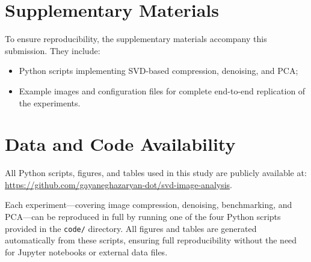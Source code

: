 \documentclass[11pt,a4paper]{article}
\begin{document}
\section{Supplementary Materials}
\label{sec:appendix-supp}

To ensure reproducibility, the supplementary materials accompany this submission. 
They include:
\begin{itemize}[leftmargin=*,noitemsep,topsep=0pt]
    \item Python scripts implementing SVD-based compression, denoising, and PCA;
    \item Example images and configuration files for complete end-to-end replication of the experiments.
\end{itemize}

\section*{Data and Code Availability}
All Python scripts, figures, and tables used in this study are publicly available at:
\url{https://github.com/gayaneghazaryan-dot/svd-image-analysis}.

Each experiment—covering image compression, denoising, benchmarking, and PCA—can be reproduced in full by running one of the four Python scripts provided in the \texttt{code/} directory. 
All figures and tables are generated automatically from these scripts, ensuring full reproducibility without the need for Jupyter notebooks or external data files.





\end{document}
